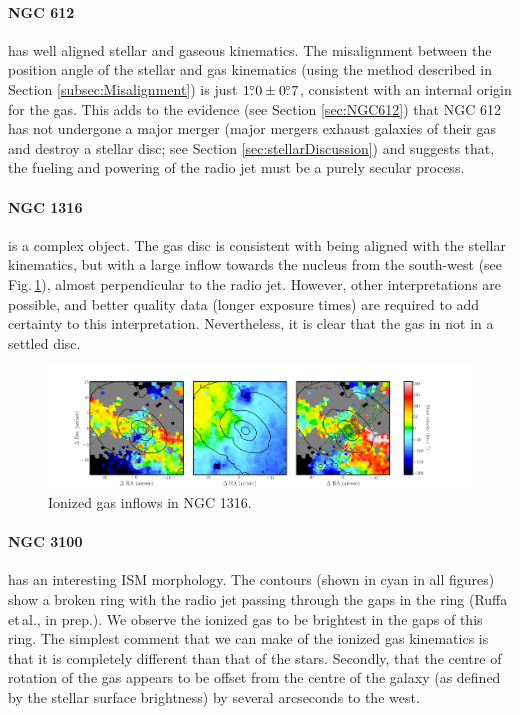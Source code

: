 	\paragraph{NGC 612} has well aligned stellar and gaseous kinematics. The misalignment between the position angle of the stellar and gas kinematics (using the method described in Section \ref{subsec:Misalignment}) is just $1\hbox{$.\!\!^\circ$}0\pm0\hbox{$.\!\!^\circ$}7$, consistent with an internal origin for the gas. This adds to the evidence (see Section \ref{sec:NGC612}) that NGC 612 has not undergone a major merger (major mergers exhaust galaxies of their gas and destroy a stellar disc; see Section \ref{sec:stellarDiscussion}) and suggests that, the fueling and powering of the radio jet must be a purely secular process. 


	\paragraph{NGC 1316} is a complex object. The gas disc is consistent with being aligned with the stellar kinematics, but with a large inflow towards the nucleus from the south-west (see Fig.\,\ref{fig:Inflow}), almost perpendicular to the radio jet. However, other interpretations are possible, and better quality data (longer exposure times) are required to add certainty to this interpretation. Nevertheless, it is clear that the gas in not in a settled disc. 

	\begin{figure}
		\centering
		\includegraphics[width=\textwidth]{chapter5/ngc1316_inflow.png}
		\caption[Inflows in NGC 1316]{Ionized gas inflows in NGC 1316.} 
		\label{fig:Inflow}
	\end{figure}


	\paragraph{NGC 3100} has an interesting ISM morphology. The  contours (shown in cyan in all figures) show a broken ring with the radio jet passing through the gaps in the ring (Ruffa et\,al., in prep.). We observe the ionized gas to be brightest in the gaps of this ring. The simplest comment that we can make of the ionized gas kinematics is that it is completely different than that of the stars. Secondly, that the centre of rotation of the gas appears to be offset from the centre of the galaxy (as defined by the stellar surface brightness) by several arcseconds to the west. 


